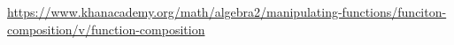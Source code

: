 \begin{readinessAssuranceResources}
\item \url{https://www.khanacademy.org/math/algebra2/manipulating-functions/funciton-composition/v/function-composition}
\end{readinessAssuranceResources}
